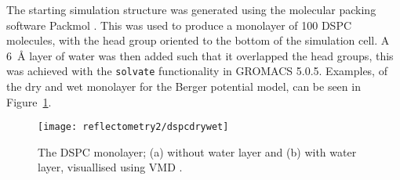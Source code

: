 The starting simulation structure was generated using the molecular packing software Packmol \cite{martinez_packmol_2009}.
This was used to produce a monolayer of \num{100} DSPC molecules, with the head group oriented to the bottom of the simulation cell.
A \SI{6}{\angstrom} layer of water was then added such that it overlapped the head groups, this was achieved with the \texttt{solvate} functionality in GROMACS 5.0.5.
Examples, of the dry and wet monolayer for the Berger potential model, can be seen in Figure~\ref{fig:drywet}.
%
\begin{figure}
    \centering
    \texttt{[image: reflectometry2/dspcdrywet]}
    \caption{The DSPC monolayer; (a) without water layer and (b) with water layer, visuallised using VMD \cite{humphrey_vmd_1996}.}
    \label{fig:drywet}
\end{figure}
%

